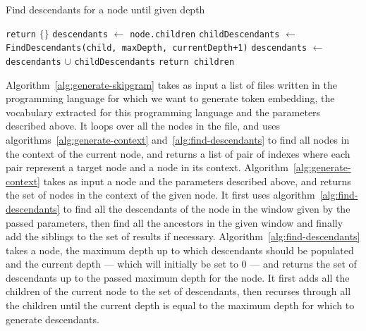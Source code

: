 \begin{algorithm}
  \caption{\label{alg:find-descendants}Find descendants for a node until given depth}
  \begin{algorithmic}[1]
        \State \lstinline{return} $\{\}$
      \EndIf
      \State \lstinline{descendants} $\gets$ \lstinline{node.children}
        \State \lstinline{childDescendants} $\gets$ \lstinline{FindDescendants(child, maxDepth, currentDepth+1)}
        \State \lstinline{descendants} $\gets$ \lstinline{descendants} $\cup$ \lstinline{childDescendants}
      \EndFor
      \State \lstinline{return children}
    \EndFunction
  \end{algorithmic}
\end{algorithm}
%
Algorithm~\ref{alg:generate-skipgram} takes as input a list of files written in
the programming language for which we want to generate token embedding, the
vocabulary extracted for this programming language and the parameters described
above. It loops over all the nodes in the file, and uses
algorithms~\ref{alg:generate-context} and~\ref{alg:find-descendants} to find all
nodes in the context of the current node, and returns a list of pair of indexes
where each pair represent a target node and a node in its context.
Algorithm~\ref{alg:generate-context} takes as input a node and the parameters
described above, and returns the set of nodes in the context of the given node.
It first uses algorithm~\ref{alg:find-descendants} to find all the descendants
of the node in the window given by the passed parameters, then find all the
ancestors in the given window and finally add the siblings to the set of results
if necessary. Algorithm~\ref{alg:find-descendants} takes a node, the maximum
depth up to which descendants should be populated and the current depth ---
which will initially be set to 0 --- and returns the set of descendants up to
the passed maximum depth for the node. It first adds all the children of the
current node to the set of descendants, then recurses through all the children
until the current depth is equal to the maximum depth for which to generate
descendants.
